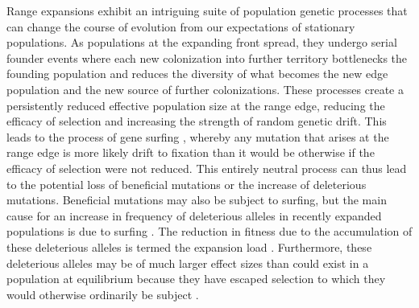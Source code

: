 Range expansions exhibit an intriguing suite of population genetic processes that can change the course of evolution from our expectations of stationary populations. As populations at the expanding front spread, they undergo serial founder events where each new colonization into further territory bottlenecks the founding population and reduces the diversity of what becomes the new edge population and the new source of further colonizations. %
These processes create a persistently reduced effective population size at the range edge, %
reducing the efficacy of selection and increasing the strength of random genetic drift. This leads to the process of gene surfing \citep{Klopfstein:2006}, whereby any mutation that arises at the range edge is more likely drift to fixation than it would be otherwise if the efficacy of selection were not reduced. This entirely neutral process can thus lead to the potential loss of beneficial mutations or the increase of deleterious mutations. Beneficial mutations may also be subject to surfing, but the main cause for an increase in frequency of deleterious alleles in recently expanded populations is due to surfing \citep{Excoffier:2009}. The reduction in fitness due to the accumulation of these deleterious alleles is termed the expansion load \citep{Peischl:2013,Peischl:2015}. Furthermore, these deleterious alleles may be of much larger effect sizes than could exist in a population at equilibrium because they have escaped selection to which they would otherwise ordinarily be subject \citep{Peischl:2015}. 

